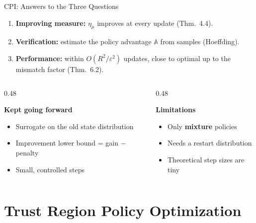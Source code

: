 \documentclass[aspectratio=169]{beamer}
\newcommand{\PA}{\mathbb{A}}              %
\begin{document}
\begin{frame}{CPI: Answers to the Three Questions}
  \begin{enumerate}
    \item \textbf{Improving measure:} $\eta_\mu$ improves at every update (Thm.~4.4).
    \item \textbf{Verification:} estimate the policy advantage $\PA$ from samples (Hoeffding).
    \item \textbf{Performance:} within $O(R^2/\varepsilon^2)$ updates, close to optimal up to the mismatch factor (Thm.~6.2).
  \end{enumerate}

  \vspace{8pt}
  \begin{columns}[t]
    \begin{column}{0.48\textwidth}
      \begin{goodbox}
        \small\textbf{Kept going forward}
        \begin{itemize}
          \item Surrogate on the old state distribution
          \item Improvement lower bound = gain $-$ penalty
          \item Small, controlled steps
        \end{itemize}
      \end{goodbox}
    \end{column}
    \begin{column}{0.48\textwidth}
      \begin{badbox}
        \small\textbf{Limitations}
        \begin{itemize}
          \item Only \textbf{mixture} policies
          \item Needs a restart distribution
          \item Theoretical step sizes are tiny
        \end{itemize}
      \end{badbox}
    \end{column}
  \end{columns}
\end{frame}

\section{Trust Region Policy Optimization}
\end{document}

